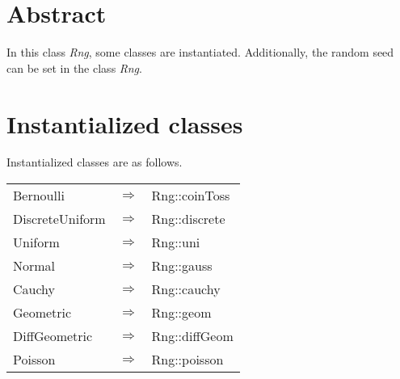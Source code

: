 %

\section{Abstract}

\noindent
In this class {\em Rng}, some classes are instantiated. Additionally,
the random seed can be set in the class {\em Rng}.

\vspace*{10mm}

\section{Instantialized classes}

\noindent
Instantialized classes are as follows.

\vspace*{3mm}

\begin{tabular}{lll}
Bernoulli       & $\Longrightarrow$ & Rng::coinToss   \\
DiscreteUniform & $\Longrightarrow$ & Rng::discrete   \\
Uniform         & $\Longrightarrow$ & Rng::uni        \\
Normal          & $\Longrightarrow$ & Rng::gauss      \\
Cauchy          & $\Longrightarrow$ & Rng::cauchy     \\
Geometric       & $\Longrightarrow$ & Rng::geom       \\
DiffGeometric   & $\Longrightarrow$ & Rng::diffGeom   \\
Poisson         & $\Longrightarrow$ & Rng::poisson    \\
\end{tabular}


